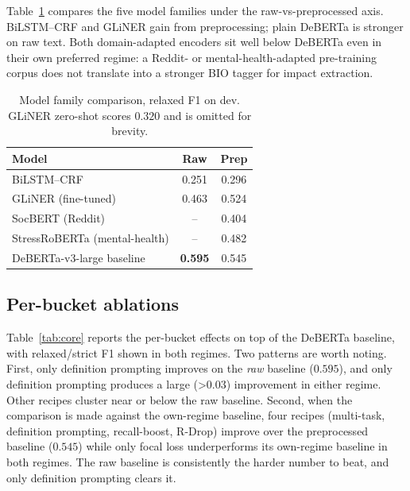 \documentclass[11pt]{article}
\begin{document}
Table~\ref{tab:backbones} compares the five model families under the
raw-vs-preprocessed axis. BiLSTM--CRF and GLiNER gain from preprocessing;
plain DeBERTa is stronger on raw text. Both domain-adapted encoders sit
well below DeBERTa even in their own preferred regime: a Reddit- or
mental-health-adapted pre-training corpus does not translate into a
stronger BIO tagger for impact extraction.

\begin{table}[t]
\centering\small
\begin{tabular}{lcc}
\toprule
Model & Raw & Prep \\
\midrule
BiLSTM--CRF & 0.251 & 0.296 \\
GLiNER (fine-tuned) & 0.463 & 0.524 \\
SocBERT (Reddit) & -- & 0.404 \\
StressRoBERTa (mental-health) & -- & 0.482 \\
DeBERTa-v3-large baseline & \textbf{0.595} & 0.545 \\
\bottomrule
\end{tabular}
\caption{Model family comparison, relaxed F1 on dev. GLiNER zero-shot
scores $0.320$ and is omitted for brevity.}
\label{tab:backbones}
\end{table}

\subsection{Per-bucket ablations}

Table~\ref{tab:core} reports the per-bucket effects on top of the
DeBERTa baseline, with relaxed/strict F1 shown in both regimes. Two
patterns are worth noting. First, only definition prompting improves on
the \emph{raw} baseline ($0.595$), and only definition prompting
produces a large (\textgreater$0.03$) improvement in either regime. Other
recipes cluster near or below the raw baseline. Second, when the
comparison is made against the own-regime baseline, four recipes
(multi-task, definition prompting, recall-boost, R-Drop) improve over
the preprocessed baseline ($0.545$) while only focal loss underperforms
its own-regime baseline in both regimes. The raw baseline is
consistently the harder number to beat, and only definition prompting
clears it.
\end{document}
